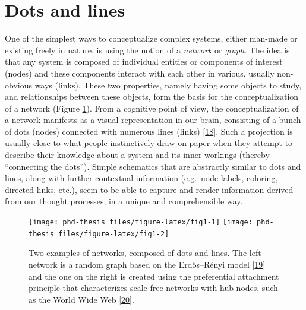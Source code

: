\documentclass[
  12pt,
]{book}
\begin{document}
\newpage

\hypertarget{dots-and-lines}{%
\section*{Dots and lines}\label{dots-and-lines}}

\indent

One of the simplest ways to conceptualize complex systems, either man-made or existing freely in nature, is using the notion of a \emph{network} or \emph{graph}.
The idea is that any system is composed of individual entities or components of interest (nodes) and these components interact with each other in various, usually non-obvious ways (links).
These two properties, namely having some objects to study, and relationships between these objects, form the basis for the conceptualization of a network (Figure \ref{fig:fig1}).
From a cognitive point of view, the conceptualization of a network manifests as a visual representation in our brain, consisting of a bunch of dots (nodes) connected with numerous lines (links) {[}\protect\hyperlink{ref-Trudeau1976}{18}{]}.
Such a projection is usually close to what people instinctively draw on paper when they attempt to describe their knowledge about a system and its inner workings (thereby ``connecting the dots'').
Simple schematics that are abstractly similar to dots and lines, along with further contextual information (e.g.~node labels, coloring, directed links, etc.), seem to be able to capture and render information derived from our thought processes, in a unique and comprehensible way.



\begin{figure}
\texttt{[image: phd-thesis\_files/figure-latex/fig1-1]} \texttt{[image: phd-thesis\_files/figure-latex/fig1-2]} \caption{Two examples of networks, composed of dots and lines. The left network is a random graph based on the Erdős--Rényi model {[}\protect\hyperlink{ref-Erdos1960}{19}{]} and the one on the right is created using the preferential attachment principle that characterizes scale-free networks with hub nodes, such as the World Wide Web {[}\protect\hyperlink{ref-Barabasi1999}{20}{]}.}\label{fig:fig1}
\end{figure}
\end{document}
